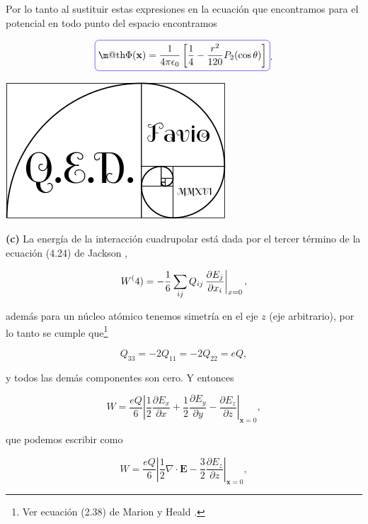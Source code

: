 \documentclass[a4paper,11pt]{article}
\makeatletter
\numberwithin{equation}{section}
\newcommand{\zerodel}{.\kern-\nulldelimiterspace}
\newcommand*{\boxcolor}{blue}
\renewcommand{\boxed}[1]{\textcolor{\boxcolor}{%
\tikz[baseline={([yshift=-1ex]current bounding box.center)}] \node [rectangle, minimum width=1ex,rounded corners,draw] {\normalcolor\m@th$\displaystyle#1$};}}
\makeatother
\begin{document}
Por lo tanto al sustituir estas expresiones en la ecuación que encontramos para el 
potencial en todo punto del espacio encontramos 

\begin{equation}
 \boxed{\Phi(\mathbf{x}) = \frac{1}{4\pi\epsilon_0}\left[\frac{1}{4} - \frac{r^2}{120} 
 P_2(\cos{\theta})\right]}.
\end{equation}

\hspace{10cm}\includegraphics[scale=0.25]{logoQED}

\textbf{(c)} La energía de la interacción cuadrupolar está dada por el tercer término
de la ecuación (4.24) de Jackson \cite{jackson}, 

\begin{equation}
 W^(4) = -\frac{1}{6}\sum_{ij} Q_{ij} \left\zerodel\frac{\partial E_j}{\partial x_i}
 \right|_{x=0},
\end{equation}

además para un núcleo atómico tenemos simetría en el eje $z$ (eje arbitrario), por 
lo tanto se cumple que\footnote{Ver ecuación (2.38) de Marion y Heald \cite{marion2}.} 

\begin{equation}
 Q_{33} = - 2Q_{11} = - 2Q_{22} = eQ,
\end{equation}

y todos las demás componentes son cero. Y entonces 

\begin{equation}
 W = \frac{eQ}{6}\left|\frac{1}{2}\frac{\partial E_x}{\partial x} + 
 \frac{1}{2}\frac{\partial E_y}{\partial y} - \frac{\partial E_z}{\partial z}
 \right|_{\mathbf{x}=0}, 
\end{equation}

que podemos escribir como 

\begin{equation}
 W = \frac{eQ}{6}\left|\frac{1}{2}\nabla \cdot \mathbf{E} 
 - \frac{3}{2}\frac{\partial E_z}{\partial z}\right|_{\mathbf{x}=0},
\end{equation}
\end{document}
